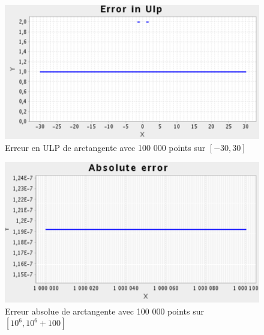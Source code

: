 \documentclass[12pt]{article}
\begin{document}
\newpage
\begin{figure}[h!]
  \begin{center}
    \includegraphics[scale=0.33]{atan_ulp.png}
    \caption{Erreur en ULP de arctangente avec 100 000 points sur $[-30,30]$}
    \label{Erreur en ULP de arctangente avec 100 000 points sur $[-30,30]$}
  \end{center}
\end{figure}
\begin{figure}[h!]
  \begin{center}
    \includegraphics[scale=0.33]{atan_far.png}
    \caption{Erreur absolue de arctangente avec 100 000 points sur $[10^6,10^6+100]$}
    \label{Erreur absolue de arctangente avec 100 000 points sur $[10^6,10^6+100]$}
  \end{center}
\end{figure}
\newpage
\end{document}
